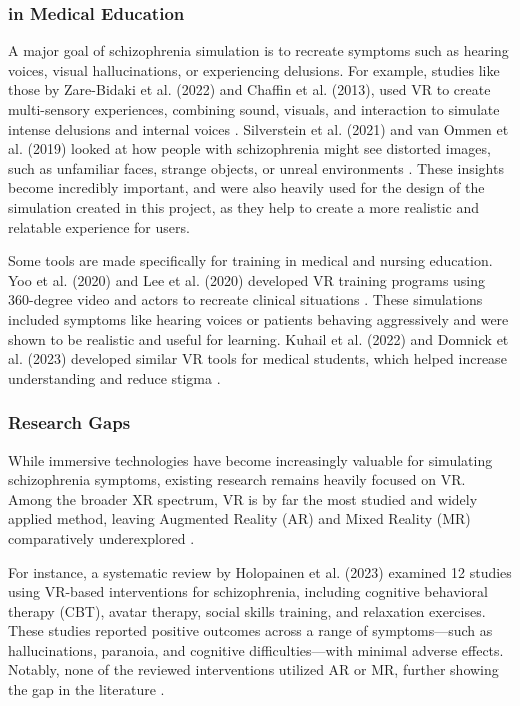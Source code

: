 \subsubsection{in Medical Education}

A major goal of schizophrenia simulation is to recreate symptoms such as hearing voices, visual hallucinations, or experiencing delusions. For example, studies like those by Zare-Bidaki et al. (2022) and Chaffin et al. (2013), used VR to create multi-sensory experiences, combining sound, visuals, and interaction to simulate intense delusions and internal voices \cite{Zare-Bidaki2022,Chaffin2013}. Silverstein et al. (2021) and van Ommen et al. (2019) looked at how people with schizophrenia might see distorted images, such as unfamiliar faces, strange objects, or unreal environments \cite{Silverstein2021,Vanommen2019}. These insights become incredibly important, and were also heavily used for the design of the simulation created in this project, as they help to create a more realistic and relatable experience for users.

Some tools are made specifically for training in medical and nursing education. Yoo et al. (2020) and Lee et al. (2020) developed VR training programs using 360-degree video and actors to recreate clinical situations \cite{Yoo2020, Lee2020}. These simulations included symptoms like hearing voices or patients behaving aggressively and were shown to be realistic and useful for learning. Kuhail et al. (2022) and Domnick et al. (2023) developed similar VR tools for medical students, which helped increase understanding and reduce stigma \cite{Kuhail2022, Domnick2023}.

\subsubsection{Research Gaps}

While immersive technologies have become increasingly valuable for simulating schizophrenia symptoms, existing research remains heavily focused on VR. Among the broader XR spectrum, VR is by far the most studied and widely applied method, leaving Augmented Reality (AR) and Mixed Reality (MR) comparatively underexplored \cite{Kuhail2022}.

For instance, a systematic review by Holopainen et al. (2023) examined 12 studies using VR-based interventions for schizophrenia, including cognitive behavioral therapy (CBT), avatar therapy, social skills training, and relaxation exercises. These studies reported positive outcomes across a range of symptoms—such as hallucinations, paranoia, and cognitive difficulties—with minimal adverse effects. Notably, none of the reviewed interventions utilized AR or MR, further showing the gap in the literature \cite{Holopainen2023}.

